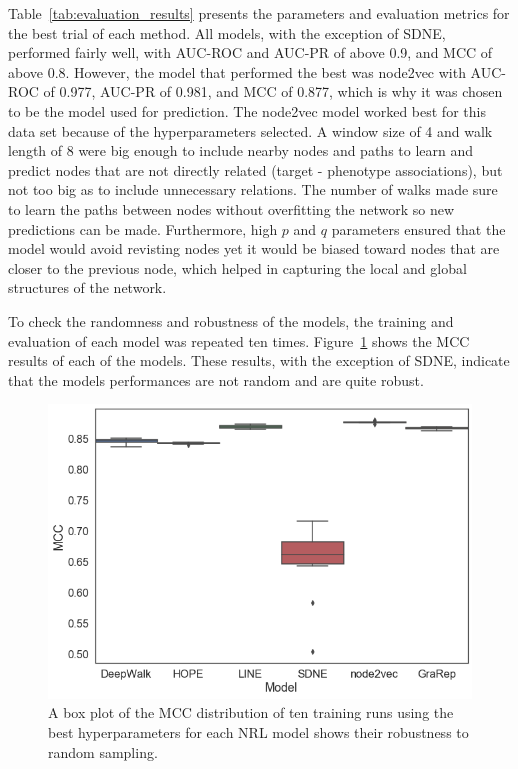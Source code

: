 Table~\ref{tab:evaluation_results} presents the parameters and evaluation metrics for the best trial of each method.
All models, with the exception of \ac{SDNE}, performed fairly well, with AUC-ROC and AUC-PR of above 0.9, and MCC of above 0.8.
However, the model that performed the best was node2vec with AUC-ROC of 0.977, AUC-PR of 0.981, and \ac{MCC} of 0.877, which is why it was chosen to be the model used for prediction.
The node2vec model worked best for this data set because of the hyperparameters selected.
A window size of 4 and walk length of 8 were big enough to include nearby nodes and paths to learn and predict nodes that are not directly related (target - phenotype associations), but not too big as to include unnecessary relations.
The number of walks made sure to learn the paths between nodes without overfitting the network so new predictions can be made.
Furthermore, high $p$ and $q$ parameters ensured that the model would avoid revisting nodes yet it would be biased toward nodes that are closer to the previous node, which helped in capturing the local and global structures of the network.

To check the randomness and robustness of the models, the training and evaluation of each model was repeated ten times.
Figure~\ref{fig:boxplot} shows the \ac{MCC} results of each of the models.
These results, with the exception of SDNE, indicate that the models performances are not random and are quite robust.

\begin{figure}[!ht]
    \centering
    \includegraphics[scale=0.5]
    {figures/boxplot.png}
    \caption[A box plot of the robustness of the evaluated network representation learning models]{\label{fig:boxplot} A box plot of the \ac{MCC} distribution of ten training runs using the best hyperparameters for each \ac{NRL} model shows their robustness to random sampling.}
\end{figure}

